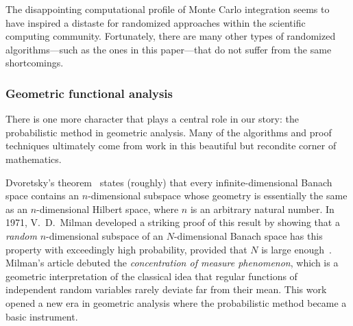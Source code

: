 \documentclass[final]{siamltex}
\newcounter{algorithm}[section]
\newcommand{\pgnotate}[1]{{\color{blue}[#1]}}
\begin{document}
The disappointing computational profile of Monte Carlo integration
seems to have inspired a distaste for randomized approaches
within the scientific computing community.
Fortunately, there are many other types of
randomized algorithms---such as the ones in this paper---that do not
suffer from the same shortcomings.



\subsubsection{Geometric functional analysis}

There is one more character that plays a central role in our story:
the probabilistic method in geometric analysis.
Many of the algorithms and proof techniques
ultimately come from work in this beautiful but recondite corner of
mathematics.

Dvoretsky's theorem~\cite{Dvo61:Some-Results} states (roughly) that
every infinite-dimensional Banach space contains an $n$-dimensional
subspace whose geometry is essentially the same as an
$n$-dimensional Hilbert space, where $n$ is an arbitrary natural
number. In 1971, V.~D.~Milman developed a striking proof of
this result by showing that a \emph{random} $n$-dimensional subspace
of an $N$-dimensional Banach space has this property with
exceedingly high probability, provided that $N$ is large
enough~\cite{Mil71:New-Proof}. Milman's article debuted
the \emph{concentration of measure phenomenon},
which is a geometric interpretation of the classical idea that
regular functions of independent random variables rarely deviate far
from their mean.  This work opened a new era in geometric analysis
where the probabilistic method became a basic instrument.

\end{document}
